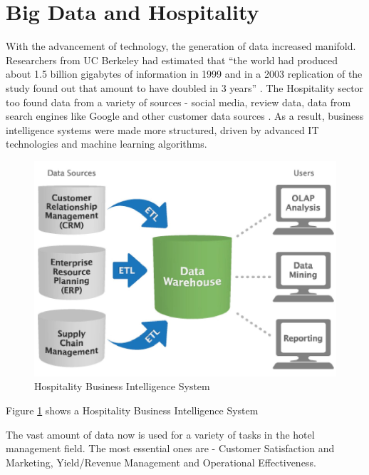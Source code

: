 \documentclass[sigconf]{acmart}
\begin{document}
\section{Big Data and Hospitality}

With the advancement of technology, the generation of data increased manifold. Researchers from UC Berkeley had estimated that ``the world had produced about 1.5 billion gigabytes of information in 1999 and in a 2003 replication of the study found out that amount to have doubled in 3 years'' \cite {gpress04}.
\newline The Hospitality sector too found data from a variety of sources - social media, review data, data from search engines like Google and other customer data sources \cite {bigdatapredictive02}. As a result, business intelligence systems were made more structured, driven by advanced IT technologies and machine learning algorithms.
\begin{figure}
	\includegraphics[width=\columnwidth]{images/business_intelligence_system.jpg}
	\caption{Hospitality Business Intelligence System \cite {businessintelligencetools08}}
        \label{F:Figure1}
\end{figure}
Figure \ref{F:Figure1} shows a Hospitality Business Intelligence System

The vast amount of data now is used for a variety of tasks in the hotel management field. The most essential ones are - Customer Satisfaction and Marketing, Yield/Revenue Management and Operational Effectiveness.
\end{document}
